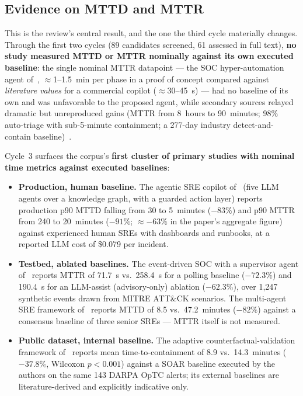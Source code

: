 \documentclass{ieeeaccess}
\begin{document}
\subsection{Evidence on MTTD and MTTR}
\label{sec:mttr}

This is the review's central result, and the one the third cycle
materially changes. Through the first two cycles (89 candidates
screened, 61 assessed in full text), \textbf{no study measured MTTD or
MTTR nominally against its own executed baseline}: the single nominal
MTTR datapoint --- the SOC hyper-automation agent of~\cite{P76},
$\approx$1--1.5~min per phase in a proof of concept compared against
\emph{literature values} for a commercial copilot ($\approx$30--45~s)
--- had no baseline of its own and was unfavorable to the proposed
agent, while secondary sources relayed dramatic but unreproduced gains
(MTTR from 8~hours to 90~minutes; 98\% auto-triage with sub-5-minute
containment; a 277-day industry detect-and-contain
baseline)~\cite{P79}.

Cycle~3 surfaces the corpus's \textbf{first cluster of primary studies
with nominal time metrics against executed baselines}:

\begin{itemize}
  \item \textbf{Production, human baseline.} The agentic SRE copilot
        of~\cite{P100} (five LLM agents over a knowledge graph, with a
        guarded action layer) reports production p90 MTTD falling from
        30 to 5~minutes ($-83\%$) and p90 MTTR from 240 to 20~minutes
        ($-91\%$; $\approx$$-63\%$ in the paper's aggregate figure)
        against experienced human SREs with dashboards and runbooks,
        at a reported LLM cost of \$0.079 per incident.
  \item \textbf{Testbed, ablated baselines.} The event-driven SOC
        with a supervisor agent of~\cite{P101} reports MTTR of 71.7~s
        vs.\ 258.4~s for a polling baseline ($-72.3\%$) and 190.4~s for
        an LLM-assist (advisory-only) ablation ($-62.3\%$), over 1{,}247
        synthetic events drawn from MITRE ATT\&CK scenarios. The multi-agent SRE framework
        of~\cite{P102} reports MTTD of 8.5 vs.\ 47.2~minutes ($-82\%$)
        against a consensus baseline of three senior SREs --- MTTR
        itself is not measured.
  \item \textbf{Public dataset, internal baseline.} The adaptive
        counterfactual-validation framework of~\cite{P123} reports mean
        time-to-containment of 8.9 vs.\ 14.3~minutes ($-37.8\%$,
        Wilcoxon $p<0.001$) against a SOAR baseline executed by the
        authors on the same 143 DARPA OpTC alerts; its external
        baselines are literature-derived and explicitly indicative only.
\end{itemize}
\end{document}
